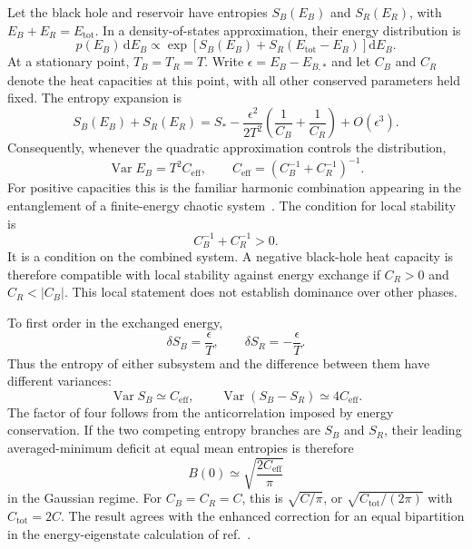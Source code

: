 \documentclass[11pt,letterpaper]{article}
\DeclareMathOperator{\Var}{Var}
\newcommand{\dd}{\mathrm{d}}
\theoremstyle{plain}
\theoremstyle{definition}
\theoremstyle{remark}
\begin{document}
Let the black hole and reservoir have entropies $S_B(E_B)$ and $S_R(E_R)$, with $E_B+E_R=E_{\mathrm{tot}}$. In a density-of-states approximation, their energy distribution is
\begin{equation}
 p(E_B)\,\dd E_B\propto
 \exp\!\left[S_B(E_B)+S_R(E_{\mathrm{tot}}-E_B)\right]\dd E_B.
 \label{eq04:energy_distribution}
\end{equation}
At a stationary point, $T_B=T_R=T$. Write $\epsilon=E_B-E_{B,*}$ and let $C_B$ and $C_R$ denote the heat capacities at this point, with all other conserved parameters held fixed. The entropy expansion is
\begin{equation}
 S_B(E_B)+S_R(E_R)
 =S_* -\frac{\epsilon^2}{2T^2}
 \left(\frac{1}{C_B}+\frac{1}{C_R}\right)+O(\epsilon^3).
 \label{eq04:entropy_hessian}
\end{equation}
Consequently, whenever the quadratic approximation controls the distribution,
\begin{equation}
 \Var E_B=T^2 C_{\mathrm{eff}},\qquad
 C_{\mathrm{eff}}=\left(C_B^{-1}+C_R^{-1}\right)^{-1}.
 \label{eq04:effective_capacity}
\end{equation}
For positive capacities this is the familiar harmonic combination appearing in the entanglement of a finite-energy chaotic system~\cite{murthysrednicki2019}. The condition for local stability is
\begin{equation}
 C_B^{-1}+C_R^{-1}>0.
 \label{eq04:stability}
\end{equation}
It is a condition on the combined system. A negative black-hole heat capacity is therefore compatible with local stability against energy exchange if $C_R>0$ and $C_R<|C_B|$. This local statement does not establish dominance over other phases.

To first order in the exchanged energy,
\begin{equation}
 \delta S_B=\frac{\epsilon}{T},\qquad
 \delta S_R=-\frac{\epsilon}{T}.
 \label{eq04:linear_entropies}
\end{equation}
Thus the entropy of either subsystem and the difference between them have different variances:
\begin{equation}
 \Var S_B\simeq C_{\mathrm{eff}},\qquad
 \Var(S_B-S_R)\simeq 4C_{\mathrm{eff}}.
 \label{eq04:gap_variance}
\end{equation}
The factor of four follows from the anticorrelation imposed by energy conservation. If the two competing entropy branches are $S_B$ and $S_R$, their leading averaged-minimum deficit at equal mean entropies is therefore
\begin{equation}
 B(0)\simeq \sqrt{\frac{2C_{\mathrm{eff}}}{\pi}}
 \label{eq04:gaussian_deficit}
\end{equation}
in the Gaussian regime. For $C_B=C_R=C$, this is $\sqrt{C/\pi}$, or $\sqrt{C_{\mathrm{tot}}/(2\pi)}$ with $C_{\mathrm{tot}}=2C$. The result agrees with the enhanced correction for an equal bipartition in the energy-eigenstate calculation of ref.~\cite{murthysrednicki2019}.
\end{document}
